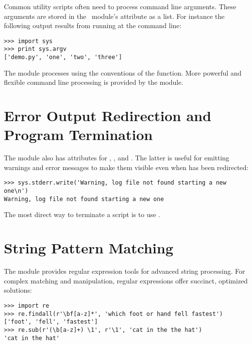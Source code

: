 \documentclass{manual}
\begin{document}
Common utility scripts often need to process command line arguments.
These arguments are stored in the
\ module's 
attribute as a list.  For instance the following output results from
running  at the command line:

\begin{verbatim}
>>> import sys
>>> print sys.argv
['demo.py', 'one', 'two', 'three']
\end{verbatim}

The 
module processes  using the conventions of the \UNIX{}
 function.  More powerful and flexible command line
processing is provided by the
 module.


\section{Error Output Redirection and Program Termination\label{stderr}}

The 
module also has attributes for , , and
.  The latter is useful for emitting warnings and error
messages to make them visible even when  has been redirected:

\begin{verbatim}
>>> sys.stderr.write('Warning, log file not found starting a new one\n')
Warning, log file not found starting a new one
\end{verbatim}

The most direct way to terminate a script is to use .


\section{String Pattern Matching\label{string-pattern-matching}}

The 
module provides regular expression tools for advanced string processing.
For complex matching and manipulation, regular expressions offer succinct,
optimized solutions:

\begin{verbatim}
>>> import re
>>> re.findall(r'\bf[a-z]*', 'which foot or hand fell fastest')
['foot', 'fell', 'fastest']
>>> re.sub(r'(\b[a-z]+) \1', r'\1', 'cat in the the hat')
'cat in the hat'
\end{verbatim}
\end{document}
